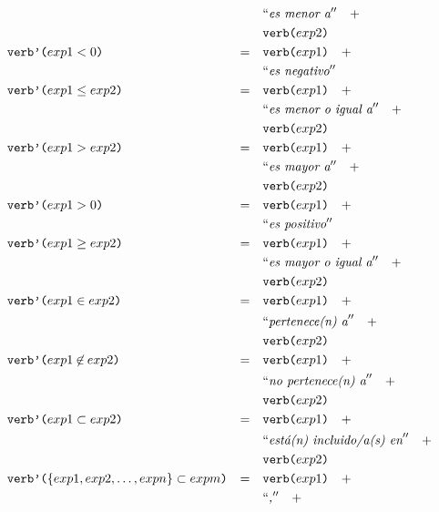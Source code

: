 \begin{align*}
& &											 		& \nlgtext{es menor a} \quad +  \\
& &											 		& \nlgfun{verb($exp2$)} \\
&\nlgfun{verb'($exp1 < 0$)} & = \quad & \nlgfun{verb($exp1$)} \quad +  \\
& &											 		& \nlgtext{es negativo} \\
&\nlgfun{verb'($exp1 \leq exp2$)} & = \quad & \nlgfun{verb($exp1$)} \quad +  \\
& &											 		& \nlgtext{es menor o igual a} \quad +  \\
& &											 		& \nlgfun{verb($exp2$)} \\
&\nlgfun{verb'($exp1 > exp2$)} & = \quad & \nlgfun{verb($exp1$)} \quad +  \\
& &											 		& \nlgtext{es mayor a} \quad +  \\
& &											 		& \nlgfun{verb($exp2$)} \\
&\nlgfun{verb'($exp1 > 0$)} & = \quad & \nlgfun{verb($exp1$)} \quad +  \\
& &											 		& \nlgtext{es positivo} \\
&\nlgfun{verb'($exp1 \geq exp2$)} & = \quad & \nlgfun{verb($exp1$)} \quad +  \\
& &											 		& \nlgtext{es mayor o igual a} \quad +  \\
& &											 		& \nlgfun{verb($exp2$)} \\
&\nlgfun{verb'($exp1 \in exp2$)} & = \quad & \nlgfun{verb($exp1$)} \quad +  \\
& &											 		& \nlgtext{pertenece(n) a} \quad +  \\
& &											 		& \nlgfun{verb($exp2$)} \\
&\nlgfun{verb'($exp1 \notin exp2$)} & = \quad & \nlgfun{verb($exp1$)} \quad +  \\
& &											 		& \nlgtext{no pertenece(n) a} \quad +  \\
& &											 		& \nlgfun{verb($exp2$)} \\
&\nlgfun{verb'($exp1 \subset exp2$)} & = \quad & \nlgfun{verb($exp1$)} \quad +  \\
& &											 		& \nlgtext{está(n) incluido/a(s) en} \quad +  \\
& &											 		& \nlgfun{verb($exp2$)} \\
&\nlgfun{verb'($\{exp1, exp2, \ldots , expn\} \subset expm$)} & = \quad & \nlgfun{verb($exp1$)} \quad +  \\
& &											 		& \nlgtext{,} \quad +  \\

\end{align*}
